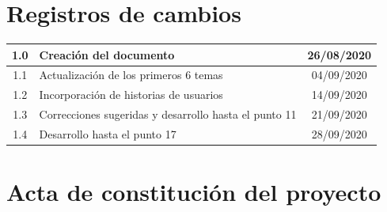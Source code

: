 \documentclass[11pt]{charter}
\begin{document}
\maketitle
\thispagestyle{empty}
\pagebreak


\section{Registros de cambios}
\label{sec:registro}


\begin{table}[ht]
\label{tab:registro}
\centering
\begin{tabularx}{\linewidth}{@{}|c|X|c|@{}}
\hline
\rowcolor[HTML]{418ddc} 
1.0      & Creación del documento                                          & 26/08/2020 \\ \hline
1.1      & Actualización de los primeros 6 temas                           & 04/09/2020 \\ \hline
1.2      & Incorporación de historias de usuarios                          & 14/09/2020 \\ \hline
1.3      & Correcciones sugeridas y desarrollo hasta el punto 11           & 21/09/2020 \\ \hline
1.4      & Desarrollo hasta el punto 17                           		   & 28/09/2020 \\ \hline
\end{tabularx}
\end{table}

\pagebreak


\section{Acta de constitución del proyecto}
\label{sec:acta}
\end{document}
